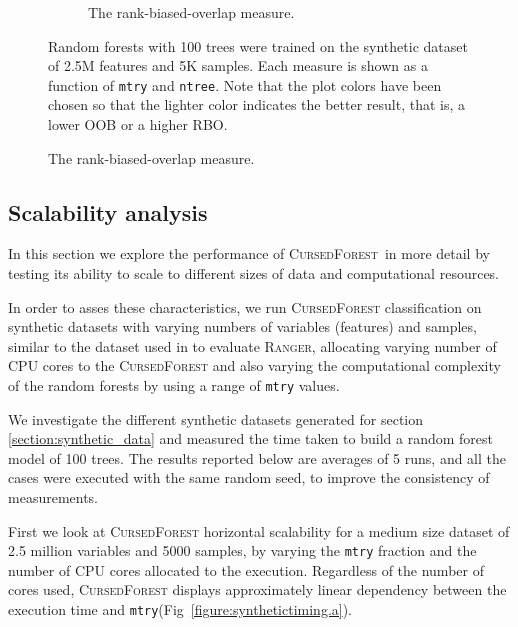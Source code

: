 \documentclass[10pt,letterpaper]{article}
\newcommand{\cursedforest}{\textsc{CursedForest}\xspace}
\newcommand{\ranger}{\textsc{Ranger}\xspace}
\newcommand{\mtry}{\texttt{mtry}\xspace}
\newcommand{\ntree}{\texttt{ntree}\xspace}
\begin{document}
\begin{figure}[tbhp]
\begin{adjustwidth}{-1.00in}{0in}
\begin{subfigure}[b]{0.5\linewidth}
      \caption{The rank-biased-overlap measure.} 
      \label{figure:rbo-prod.png} 
    \end{subfigure} 
    \begin{flushleft} 
      Random forests with 100 trees were trained on the synthetic dataset of 2.5M features and 5K samples.
      Each measure is shown as a function of \mtry and \ntree. Note that the plot colors have been chosen so that the lighter color indicates
      the better result, that is, a lower OOB or a higher RBO.
    \end{flushleft}
  \end{adjustwidth}
\end{figure}



\subsection{Scalability analysis}
In this section we explore the performance of \cursedforest\ in more detail by testing its ability to scale to different sizes of data
and computational resources.

In order to asses these characteristics, we run \cursedforest classification on synthetic datasets with varying numbers
of variables (features) and samples, similar to the dataset used in \cite{Wright.and.Ziegle.2016} to evaluate
\ranger, allocating varying number of CPU cores to the \cursedforest and also varying the computational complexity
of the random forests by using a range of \mtry values.

We investigate the different synthetic datasets generated for section \ref{section:synthetic_data} and measured the time
taken to build a random forest model of 100 trees. The results reported below are averages of 5 runs, and all the cases
were executed with the same random seed, to improve the consistency of measurements.

First we look at \cursedforest horizontal scalability for a medium size dataset of 2.5 million variables and 5000
samples, by varying the \mtry  fraction and the number of CPU cores allocated to the execution. 
Regardless of the number of cores used, \cursedforest displays approximately linear dependency between the execution
time and \mtry (Fig~\ref{figure:synthetictiming.a}).
\end{document}
